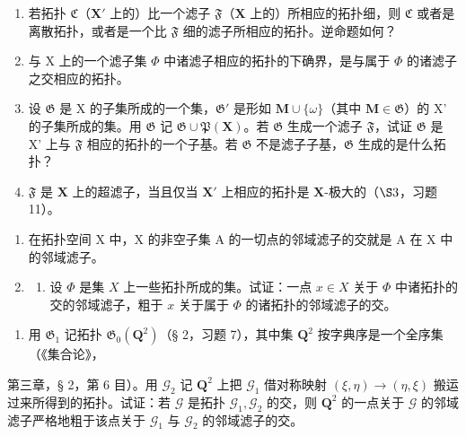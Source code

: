 \begin{enumerate}
\def\labelenumi{\alph{enumi})}
\item
  若拓扑 \(\mathfrak{C}\)（\(\mathbf{X}'\) 上的）比一个滤子 \(\mathfrak{F}\)（\(\mathbf{X}\) 上的）所相应的拓扑细，则 \(\mathfrak{C}\) 或者是离散拓扑，或者是一个比 \(\mathfrak{F}\) 细的滤子所相应的拓扑。逆命题如何？
\item
  与 X 上的一个滤子集 \(\Phi\) 中诸滤子相应的拓扑的下确界，是与属于 \(\Phi\) 的诸滤子之交相应的拓扑。
\item
  设 \(\mathfrak{G}\) 是 X 的子集所成的一个集，\(\mathfrak{G}'\) 是形如 \(\mathbf{M} \cup \{\omega\}\)（其中 \(\mathbf{M} \in \mathfrak{G}\)）的 X' 的子集所成的集。用 \(\mathfrak{G}\) 记 \(\mathfrak{G} \cup \mathfrak{P}(\mathbf{X})\)。若 \(\mathfrak{G}\) 生成一个滤子 \(\mathfrak{F}\)，试证 \(\mathfrak{G}\) 是 X' 上与 \(\mathfrak{F}\) 相应的拓扑的一个子基。若 \(\mathfrak{G}\) 不是滤子子基，\(\mathfrak{G}\) 生成的是什么拓扑？
\item
  \(\mathfrak{F}\) 是 \(\mathbf{X}\) 上的超滤子，当且仅当 \(\mathbf{X}'\) 上相应的拓扑是 \(\mathbf{X}\)-极大的（\(\S 3\)，习题 11）。
\end{enumerate}

\begin{enumerate}
\def\labelenumi{\arabic{enumi})}
\setcounter{enumi}{6}
\item
  在拓扑空间 X 中，X 的非空子集 A 的一切点的邻域滤子的交就是 A 在 X 中的邻域滤子。
\item
  \begin{enumerate}
  \def\labelenumii{\alph{enumii})}
  \tightlist
  \item
    设 \(\Phi\) 是集 \(X\) 上一些拓扑所成的集。试证：一点 \(x \in X\) 关于 \(\Phi\) 中诸拓扑的交的邻域滤子，粗于 \(x\) 关于属于 \(\Phi\) 的诸拓扑的邻域滤子的交。
  \end{enumerate}
\end{enumerate}

\begin{enumerate}
\def\labelenumi{\alph{enumi})}
\setcounter{enumi}{1}
\tightlist
\item
  用 \(\mathfrak{G}_1\) 记拓扑 \(\mathfrak{G}_0(\mathbf{Q}^2)\)（§ 2，习题 7），其中集 \(\mathbf{Q}^2\) 按字典序是一个全序集（《集合论》，
\end{enumerate}

第三章，§ 2，第 6 目）。用 \(\mathcal{G}_2\) 记 \(\mathbf{Q}^2\) 上把 \(\mathcal{G}_1\) 借对称映射 \((\xi, \eta) \to (\eta, \xi)\) 搬运过来所得到的拓扑。试证：若 \(\mathcal{G}\) 是拓扑 \(\mathcal{G}_1, \mathcal{G}_2\) 的交，则 \(\mathbf{Q}^2\) 的一点关于 \(\mathcal{G}\) 的邻域滤子严格地粗于该点关于 \(\mathcal{G}_1\) 与 \(\mathcal{G}_2\) 的邻域滤子的交。

